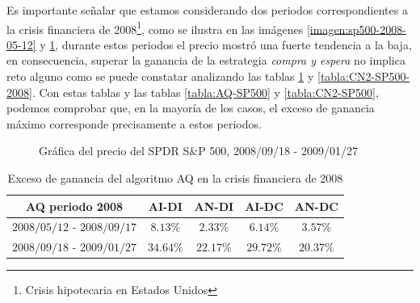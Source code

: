 \documentclass[12pt]{report}
\theoremstyle{break}
\theoremstyle{break}
\begin{document}
Es importante señalar que estamos considerando dos periodos correspondientes a la crisis financiera de 2008\footnote{Crisis hipotecaria en Estados Unidos}, como se ilustra en las imágenes \ref{imagen:sp500-2008-05-12} y \ref{imagen:sp500-2008-09-18}, durante estos periodos el precio mostró una fuerte tendencia a la baja, en consecuencia, superar la ganancia de la estrategia \textit{compra y espera} no implica reto alguno como se puede constatar analizando las tablas \ref{tabla:AQ-SP500-2008} y \ref{tabla:CN2-SP500-2008}. Con estas tablas y las tablas \ref{tabla:AQ-SP500} y \ref{tabla:CN2-SP500}, podemos comprobar que, en la mayoría de los casos, el exceso de ganancia máximo corresponde precisamente a estos periodos.

\begin{figure}[htbp]
\centering
{}
\caption{\label{imagen:sp500-2008-09-18} Gráfica del precio del SPDR S\&P 500, 2008/09/18 - 2009/01/27}
\end{figure}

\begin{center}
\begin{table}[htbp]
\centering
\begin{tabular}{ccccc}
\hline
\textbf{AQ periodo 2008} & \textbf{AI-DI} & \textbf{AN-DI} & \textbf{AI-DC} & \textbf{AN-DC} \\
\hline
$2008/05/12$ - $2008/09/17$ & $8.13\%$ & $2.33\%$ & $6.14\%$ & $3.57\%$ \\
$2008/09/18$ - $2009/01/27$ & $34.64\%$ & $22.17\%$ & $29.72\%$ & $20.37	\%$  \\
\hline
\end{tabular}
\caption{\label{tabla:AQ-SP500-2008} Exceso de ganancia del algoritmo AQ en la crisis financiera de 2008}
\end{table}
\end{center}
\end{document}
